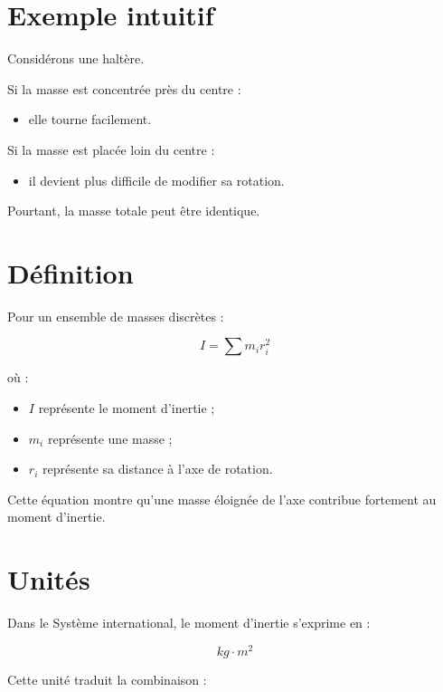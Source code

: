 \section{Exemple intuitif}

Considérons une haltère.

Si la masse est concentrée près du centre :

\begin{itemize}
    \item elle tourne facilement.
\end{itemize}

Si la masse est placée loin du centre :

\begin{itemize}
    \item il devient plus difficile de modifier sa rotation.
\end{itemize}

Pourtant, la masse totale peut être identique.

\section{Définition}

Pour un ensemble de masses discrètes :

\begin{equation}
I = \sum m_i r_i^2
\end{equation}

où :

\begin{itemize}
    \item $I$ représente le moment d'inertie ;
    \item $m_i$ représente une masse ;
    \item $r_i$ représente sa distance à l'axe de rotation.
\end{itemize}

Cette équation montre qu'une masse éloignée de l'axe contribue fortement au
moment d'inertie.

\section{Unités}

Dans le Système international, le moment d'inertie s'exprime en :

\begin{equation}
kg \cdot m^2
\end{equation}

Cette unité traduit la combinaison :

